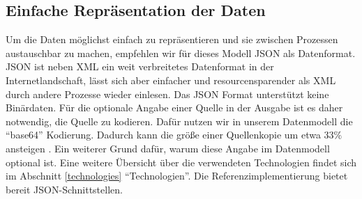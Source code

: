 \subsection{Einfache Repräsentation der Daten}
Um die Daten möglichst einfach zu repräsentieren und sie zwischen Prozessen austauschbar zu machen, empfehlen wir für dieses Modell JSON als Datenformat. JSON ist neben XML ein weit verbreitetes Datenformat in der Internetlandschaft, lässt sich aber einfacher und resourcensparender als XML durch andere Prozesse wieder einlesen. Das JSON Format unterstützt keine Binärdaten. Für die optionale Angabe einer Quelle in der Ausgabe ist es daher notwendig, die Quelle zu kodieren. Dafür nutzen wir in unserem Datenmodell die ``base64'' Kodierung. Dadurch kann die größe einer Quellenkopie um etwa $33\%$ ansteigen \cite{ng2005study}. Ein weiterer Grund dafür, warum diese Angabe im Datenmodell optional ist. Eine weitere Übersicht über die verwendeten Technologien findet sich im Abschnitt \ref{technologies} ``Technologien''. Die Referenzimplementierung bietet bereit JSON-Schnittstellen.
